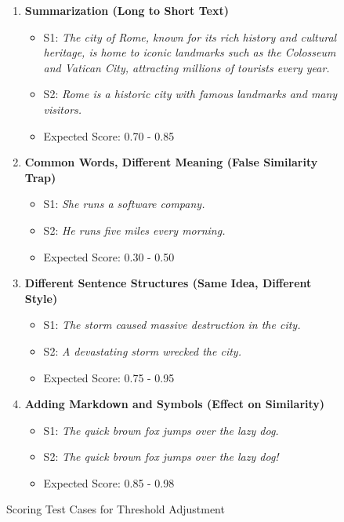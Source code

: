{\begin{figure}[!htbp]
\begin{minipage}{\textwidth}
{\begin{minipage}{0.95\textwidth}
\begin{enumerate}
\item \textbf{Summarization (Long to Short Text)}
\begin{itemize}
\setlength{\itemsep}{0pt}
\item S1: \textit{The city of Rome, known for its rich history and cultural heritage, is home to iconic landmarks such as the Colosseum and Vatican City, attracting millions of tourists every year.}
\item S2: \textit{Rome is a historic city with famous landmarks and many visitors.}
\item Expected Score: 0.70 - 0.85
\end{itemize}

\item \textbf{Common Words, Different Meaning (False Similarity Trap)}
\begin{itemize}
\setlength{\itemsep}{0pt}
\item S1: \textit{She runs a software company.}
\item S2: \textit{He runs five miles every morning.}
\item Expected Score: 0.30 - 0.50
\end{itemize}

\item \textbf{Different Sentence Structures (Same Idea, Different Style)}
\begin{itemize}
\setlength{\itemsep}{0pt}
\item S1: \textit{The storm caused massive destruction in the city.}
\item S2: \textit{A devastating storm wrecked the city.}
\item Expected Score: 0.75 - 0.95
\end{itemize}

\item \textbf{Adding Markdown and Symbols (Effect on Similarity)}
\begin{itemize}
\setlength{\itemsep}{0pt}
\item S1: \textit{The quick brown fox jumps over the lazy dog.}
\item S2: \textit{The quick brown fox jumps over the lazy dog!}
\item Expected Score: 0.85 - 0.98
\end{itemize}
\end{enumerate}
\vspace{0.2cm}
\end{minipage}}
\end{minipage}
\caption[Scoring Test Cases for Threshold Adjustment]{Scoring Test Cases for Threshold Adjustment}
\label{fig:test_case_scenarios}
\end{figure}
\FloatBarrier

}
